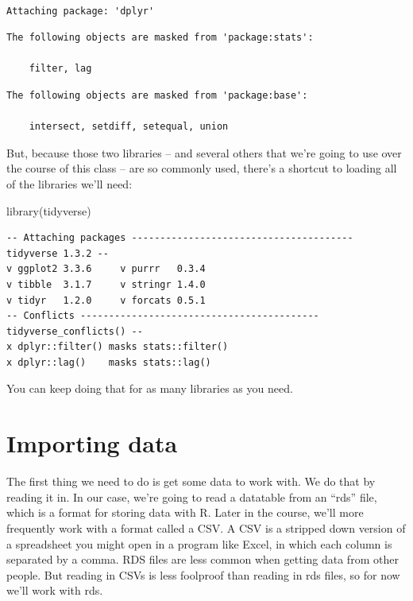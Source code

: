 \documentclass[
  letterpaper,
  DIV=11,
  numbers=noendperiod]{scrreprt}
\newenvironment{Shaded}{\begin{snugshade}}{\end{snugshade}}
\newcommand{\FunctionTok}[1]{\textcolor[rgb]{0.28,0.35,0.67}{#1}}
\newcommand{\NormalTok}[1]{\textcolor[rgb]{0.00,0.23,0.31}{#1}}
\begin{document}
\begin{verbatim}

Attaching package: 'dplyr'
\end{verbatim}

\begin{verbatim}
The following objects are masked from 'package:stats':

    filter, lag
\end{verbatim}

\begin{verbatim}
The following objects are masked from 'package:base':

    intersect, setdiff, setequal, union
\end{verbatim}

But, because those two libraries -- and several others that we're going
to use over the course of this class -- are so commonly used, there's a
shortcut to loading all of the libraries we'll need:

\begin{Shaded}
\begin{Highlighting}[]
\FunctionTok{library}\NormalTok{(tidyverse)}
\end{Highlighting}
\end{Shaded}

\begin{verbatim}
-- Attaching packages --------------------------------------- tidyverse 1.3.2 --
v ggplot2 3.3.6     v purrr   0.3.4
v tibble  3.1.7     v stringr 1.4.0
v tidyr   1.2.0     v forcats 0.5.1
-- Conflicts ------------------------------------------ tidyverse_conflicts() --
x dplyr::filter() masks stats::filter()
x dplyr::lag()    masks stats::lag()
\end{verbatim}

You can keep doing that for as many libraries as you need.

\hypertarget{importing-data}{%
\section{Importing data}\label{importing-data}}

The first thing we need to do is get some data to work with. We do that
by reading it in. In our case, we're going to read a datatable from an
``rds'' file, which is a format for storing data with R. Later in the
course, we'll more frequently work with a format called a CSV. A CSV is
a stripped down version of a spreadsheet you might open in a program
like Excel, in which each column is separated by a comma. RDS files are
less common when getting data from other people. But reading in CSVs is
less foolproof than reading in rds files, so for now we'll work with
rds.
\end{document}
